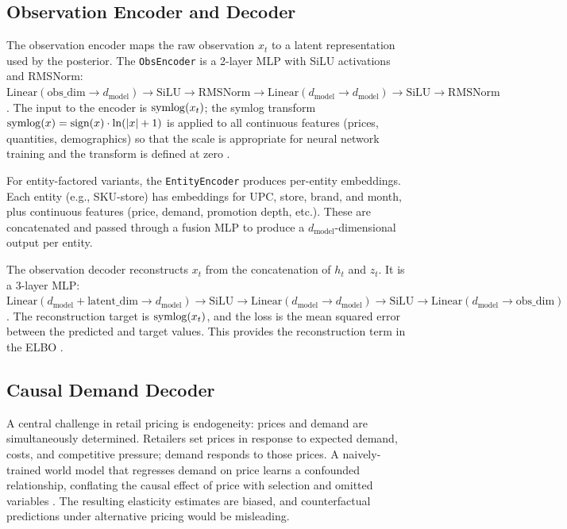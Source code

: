 \subsection{Observation Encoder and Decoder}

The observation encoder maps the raw observation $x_t$ to a latent representation used by the posterior. The \texttt{ObsEncoder} is a 2-layer MLP with SiLU activations and RMSNorm: $\text{Linear}(\text{obs\_dim} \to d_{\text{model}}) \to \text{SiLU} \to \text{RMSNorm} \to \text{Linear}(d_{\text{model}} \to d_{\text{model}}) \to \text{SiLU} \to \text{RMSNorm}$. The input to the encoder is $\operatorname{symlog}(x_t)$; the symlog transform $\operatorname{symlog}(x) = \text{sign}(x) \cdot \ln(|x| + 1)$ is applied to all continuous features (prices, quantities, demographics) so that the scale is appropriate for neural network training and the transform is defined at zero \citep{hafner2023dreamerv3}.

For entity-factored variants, the \texttt{EntityEncoder} produces per-entity embeddings. Each entity (e.g., SKU-store) has embeddings for UPC, store, brand, and month, plus continuous features (price, demand, promotion depth, etc.). These are concatenated and passed through a fusion MLP to produce a $d_{\text{model}}$-dimensional output per entity.

The observation decoder reconstructs $x_t$ from the concatenation of $h_t$ and $z_t$. It is a 3-layer MLP: $\text{Linear}(d_{\text{model}} + \text{latent\_dim} \to d_{\text{model}}) \to \text{SiLU} \to \text{Linear}(d_{\text{model}} \to d_{\text{model}}) \to \text{SiLU} \to \text{Linear}(d_{\text{model}} \to \text{obs\_dim})$. The reconstruction target is $\operatorname{symlog}(x_t)$, and the loss is the mean squared error between the predicted and target values. This provides the reconstruction term in the ELBO \citep{kingma2014vae}.

\subsection{Causal Demand Decoder}

A central challenge in retail pricing is endogeneity: prices and demand are simultaneously determined. Retailers set prices in response to expected demand, costs, and competitive pressure; demand responds to those prices. A naively-trained world model that regresses demand on price learns a confounded relationship, conflating the causal effect of price with selection and omitted variables \citep{hausman1978specification}. The resulting elasticity estimates are biased, and counterfactual predictions under alternative pricing would be misleading.

